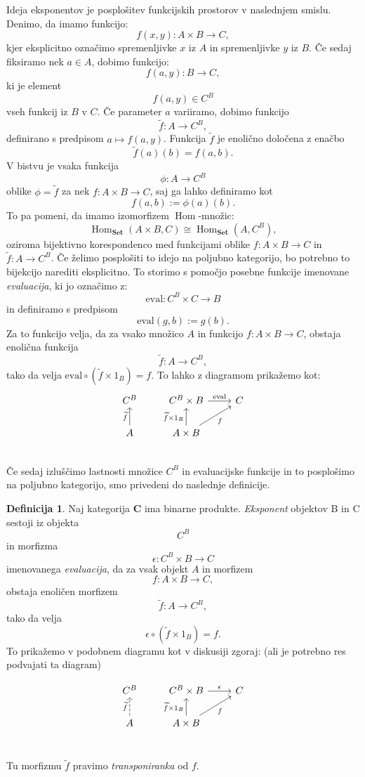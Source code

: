 \documentclass[12pt,a4paper]{book}
\theoremstyle{definition}
\newtheorem{definicija}{Definicija}[chapter]
\theoremstyle{plain}
\theoremstyle{definition}
\theoremstyle{remark}
\newcommand{\cat}[1]{\textbf{#1}}
\DeclareMathOperator{\Hom}{Hom}
\begin{document}
Ideja eksponentov je posplošitev funkcijskih prostorov v naslednjem smislu. Denimo, da imamo funkcijo:
$$f(x,y) : A \times B \to C,$$
kjer eksplicitno označimo spremenljivke $x$ iz $A$ in spremenljivke $y$ iz $B$. Če sedaj fiksiramo nek $a \in A$, dobimo funkcijo:
$$f(a,y): B \to C,$$
ki je element
$$f(a,y) \in C^B$$
vseh funkcij iz $B$ v $C$. Če parameter $a$ variiramo, dobimo funkcijo
$$\widetilde{f} : A \to C^B,$$
definirano s predpisom $a \mapsto f(a,y)$. Funkcija $\widetilde{f}$ je enolično določena z enačbo
$$\widetilde{f}(a)(b) = f(a,b).$$
V bistvu je vsaka funkcija 
$$\phi : A \to C^B$$
oblike $\phi = \widetilde{f}$ za nek $f : A \times B \to C$, saj ga lahko definiramo kot
$$f(a,b) := \phi(a)(b).$$
To pa pomeni, da imamo izomorfizem $\Hom$-množic:
$$\Hom_{\cat{Set}}(A \times B, C) \cong \Hom_{\cat{Set}}(A, C^B),$$
oziroma bijektivno korespondenco med funkcijami oblike $f : A\times B \to C$ in $\widetilde{f} : A \to C^B$. Če želimo posplošiti to idejo na poljubno kategorijo, bo potrebno to bijekcijo narediti eksplicitno. To storimo s pomočjo posebne funkcije imenovane \emph{evaluacija}, ki jo označimo z:
$$\mathrm{eval} : C^B \times C \to B$$
in definiramo s predpisom 
$$\mathrm{eval}(g,b) := g(b).$$
Za to funkcijo velja, da za vsako množico $A$ in funkcijo $f : A \times B \to C$, obstaja enolična funkcija
$$\widetilde{f} : A \to C^B,$$
tako da velja $\mathrm{eval} \circ (\widetilde{f} \times 1_B) = f$. To lahko z diagramom prikažemo kot:
$$\begin{tikzcd}
C^B &  C^B \times B \ar[r, "\mathrm{eval}"] & C \\
A \ar[u, "\widetilde{f}"] &  A \times B \ar[u, "\widetilde{f} \times 1_B"] \ar[ur, "f"'] & \\
\end{tikzcd}$$
Če sedaj izluščimo lastnosti množice $C^B$ in evaluacijske funkcije in to posplošimo na poljubno kategorijo, smo privedeni do naslednje definicije.

\begin{definicija}
Naj kategorija $\cat{C}$ ima binarne produkte. \emph{Eksponent} objektov B in C sestoji iz objekta 
$$C^B$$
in morfizma
$$\epsilon : C^B \times B \to C$$ imenovanega \emph{evaluacija}, da za vsak objekt $A$ in morfizem 
$$f : A \times B \to C,$$
obstaja enoličen morfizem 
$$\widetilde{f} : A \to C^B,$$
tako da velja
$$\epsilon \circ (\widetilde{f} \times 1_B) = f.$$
To prikažemo v podobnem diagramu kot v diskusiji zgoraj: (ali je potrebno res podvajati ta diagram)

$$\begin{tikzcd}
C^B &  C^B \times B \ar[r, "\epsilon"] & C \\
A \ar[u, dashed, "\widetilde{f}"] &  A \times B \ar[u, "\widetilde{f} \times 1_B"] \ar[ur, "f"'] & \\
\end{tikzcd}$$

Tu morfizmu $\widetilde{f}$ pravimo \emph{transponiranka} od $f$.
\end{definicija}
\end{document}
